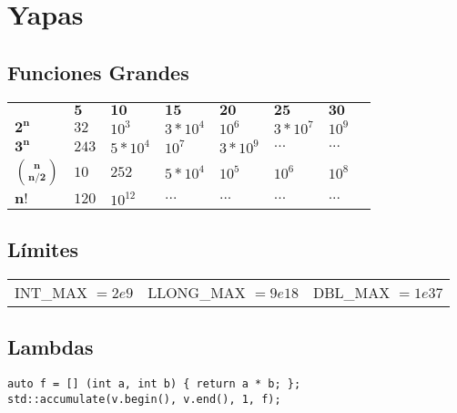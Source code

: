 \documentclass{article}
\begin{document}



\pagebreak


\section{Yapas}

\subsection*{Funciones Grandes}

\begin{tabularx}{0.33\textwidth}{YYYYYYYY}
                      & $\mathbf{5}$ & $\mathbf{10}$ & $\mathbf{15}$ & $\mathbf{20}$ & $\mathbf{25}$ & $\mathbf{30}$ \\
     $\mathbf{2^n}$            & $32$  & $10^3$    & $3*10^4$ & $10^6$   & $3*10^7$ & $10^9$ \\
     $\mathbf{3^n}$            & $243$ & $5*10^4$  & $10^7$   & $3*10^9$ & $...$    & $...$ \\
     $\mathbf{\binom{n}{n/2}}$ & $10$  & $252$     & $5*10^4$ & $10^5$   & $10^6$   & $10^8$ \\
     $\mathbf{n!}$             & $120$ & $10^{12}$ & $...$    & $...$    & $...$    & $...$
\end{tabularx}

\subsection*{Límites}
\begin{tabular}{ccc}
    INT\_MAX $= 2e9$ & LLONG\_MAX $= 9e18$ & DBL\_MAX $= 1e37$
\end{tabular}

\subsection*{Lambdas}
\begin{lstlisting}
auto f = [] (int a, int b) { return a * b; };
std::accumulate(v.begin(), v.end(), 1, f);
\end{lstlisting}
\end{document}
